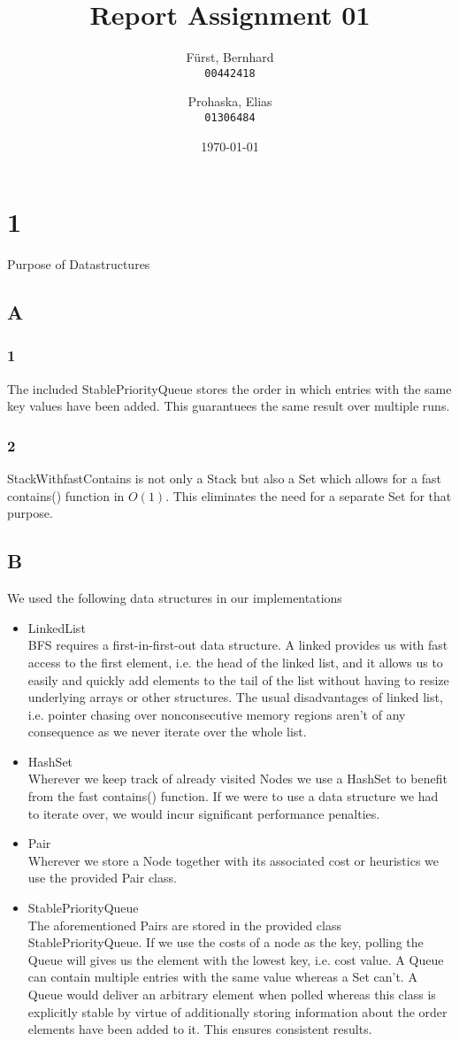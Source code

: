 \documentclass{article}
\title{Report Assignment 01}
\author{Fürst, Bernhard\\ \texttt{00442418}
        \and
        Prohaska, Elias \\ \texttt{01306484}}
\date{\today}
\begin{document}
    \maketitle
    \section*{1}
    Purpose of Datastructures
    \subsection*{A}
    \subsubsection*{1}
    The included StablePriorityQueue stores the order in which entries with the same key values have been added.
    This guarantuees the same result over multiple runs.
    \subsubsection*{2}
    StackWithfastContains is not only a Stack but also a Set which allows for a fast contains() function in $O(1)$. This eliminates the need for a separate Set for that purpose.
    \subsection*{B}
    We used the following data structures in our implementations
    \begin{itemize}
        \item{LinkedList} \\ BFS requires a first-in-first-out data structure. A linked provides us with fast access to the first element, i.e. the head of the linked list, and it allows us to easily and quickly add elements to the tail of the list without having to resize underlying arrays or other structures. The usual disadvantages of linked list, i.e. pointer chasing over nonconsecutive memory regions aren't of any consequence as we never iterate over the whole list.
        \item{HashSet} \\ Wherever we keep track of already visited Nodes we use a HashSet to benefit from the fast contains() function. If we were to use a data structure we had to iterate over, we would incur significant performance penalties.
        \item{Pair} \\ Wherever we store a Node together with its associated cost or heuristics we use the provided Pair class.
        \item {StablePriorityQueue} \\ The aforementioned Pairs are stored in the provided class StablePriorityQueue. If we use the costs of a node as the key, polling the Queue will gives us the element with the lowest key, i.e. cost value. A Queue can contain multiple entries with the same value whereas a Set can't. A Queue would deliver an arbitrary element when polled whereas this class is explicitly stable by virtue of additionally storing information about the order elements have been added to it. This ensures consistent results.
    \end{itemize}
\end{document}
